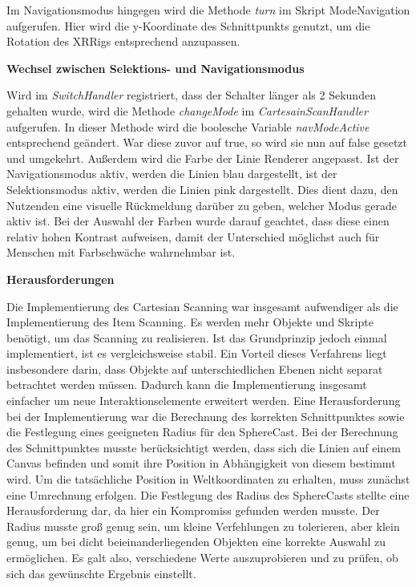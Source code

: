 Im Navigationsmodus hingegen wird die Methode \textit{turn} im Skript ModeNavigation aufgerufen. Hier wird die y-Koordinate des Schnittpunkts genutzt, um die Rotation des XRRigs entsprechend anzupassen.

\textbf{Wechsel zwischen Selektions- und Navigationsmodus}

Wird im \textit{SwitchHandler} registriert, dass der Schalter länger als 2 Sekunden gehalten wurde, wird die Methode \textit{changeMode} im \textit{CartesainScanHandler} aufgerufen. In dieser Methode wird die boolesche Variable \textit{navModeActive} entsprechend geändert. War diese zuvor auf true, so wird sie nun auf false gesetzt und umgekehrt. Außerdem wird die Farbe der Linie Renderer angepasst. Ist der Navigationsmodus aktiv, werden die Linien blau dargestellt, ist der Selektionsmodus aktiv, werden die Linien pink dargestellt. Dies dient dazu, den Nutzenden eine visuelle Rückmeldung darüber zu geben, welcher Modus gerade aktiv ist. Bei der Auswahl der Farben wurde darauf geachtet, dass diese einen relativ hohen Kontrast aufweisen, damit der Unterschied möglichst auch für Menschen mit Farbschwäche wahrnehmbar ist. 

\textbf{Herausforderungen}

Die Implementierung des Cartesian Scanning war insgesamt aufwendiger als die Implementierung des Item Scanning. Es werden mehr Objekte und Skripte benötigt, um das Scanning zu realisieren. Ist das Grundprinzip jedoch einmal implementiert, ist es vergleichsweise stabil. Ein Vorteil dieses Verfahrens liegt insbesondere darin, dass Objekte auf unterschiedlichen Ebenen nicht separat betrachtet werden müssen. Dadurch kann die Implementierung insgesamt einfacher um neue Interaktionselemente erweitert werden. 
Eine Herausforderung bei der Implementierung war die Berechnung des korrekten Schnittpunktes sowie die Festlegung eines geeigneten Radius für den SphereCast. Bei der Berechnung des Schnittpunktes musste berücksichtigt werden, dass sich die Linien auf einem Canvas befinden und somit ihre Position in Abhängigkeit von diesem bestimmt wird. Um die tatsächliche Position in Weltkoordinaten zu erhalten, muss zunächst eine Umrechnung erfolgen. Die Festlegung des Radius des SphereCasts stellte eine Herausforderung dar, da hier ein Kompromiss gefunden werden musste. Der Radius musste groß genug sein, um kleine Verfehlungen zu tolerieren, aber klein genug, um bei dicht beieinanderliegenden Objekten eine korrekte Auswahl zu ermöglichen. Es galt also, verschiedene Werte auszuprobieren und zu prüfen, ob sich das gewünschte Ergebnis einstellt. 

